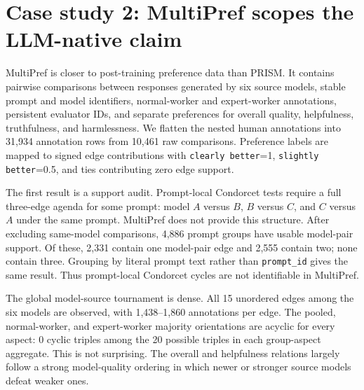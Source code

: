 \documentclass[10pt]{article}
\theoremstyle{definition}
\theoremstyle{remark}
\begin{document}
\section{Case study 2: MultiPref scopes the LLM-native claim}
\label{sec:multipref}

MultiPref\cite{miranda2025} is closer to post-training preference data than PRISM. It contains pairwise comparisons between responses generated by six source models, stable prompt and model identifiers, normal-worker and expert-worker annotations, persistent evaluator IDs, and separate preferences for overall quality, helpfulness, truthfulness, and harmlessness. We flatten the nested human annotations into 31,934 annotation rows from 10,461 raw comparisons. Preference labels are mapped to signed edge contributions with \texttt{clearly better}=1, \texttt{slightly better}=0.5, and ties contributing zero edge support.

The first result is a support audit. Prompt-local Condorcet tests require a full three-edge agenda for some prompt: model $A$ versus $B$, $B$ versus $C$, and $C$ versus $A$ under the same prompt. MultiPref does not provide this structure. After excluding same-model comparisons, 4,886 prompt groups have usable model-pair support. Of these, 2,331 contain one model-pair edge and 2,555 contain two; none contain three. Grouping by literal prompt text rather than \texttt{prompt\_id} gives the same result. Thus prompt-local Condorcet cycles are not identifiable in MultiPref.

The global model-source tournament is dense. All 15 unordered edges among the six models are observed, with 1,438--1,860 annotations per edge. The pooled, normal-worker, and expert-worker majority orientations are acyclic for every aspect: $0$ cyclic triples among the 20 possible triples in each group-aspect aggregate. This is not surprising. The overall and helpfulness relations largely follow a strong model-quality ordering in which newer or stronger source models defeat weaker ones.
\end{document}
